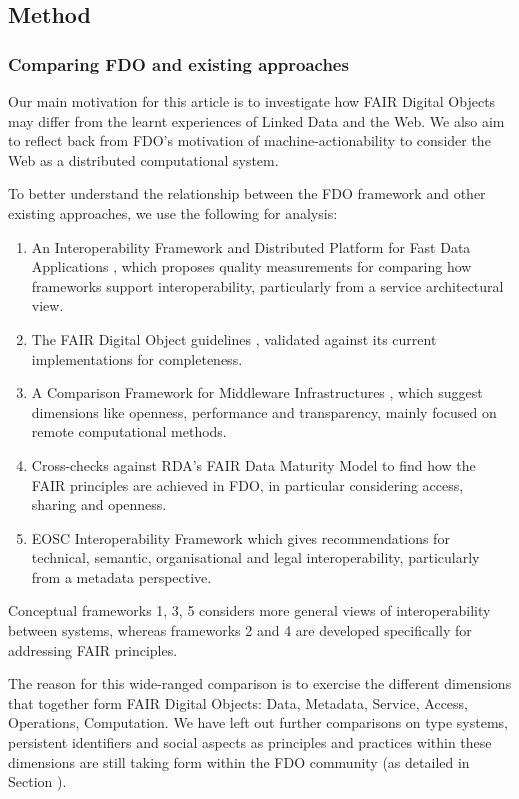 \subsection{Method}\label{ch3:method}

\subsubsection{Comparing FDO and existing approaches}\label{ch3:comparing}

Our main motivation for this article is to investigate how FAIR Digital Objects may differ from the learnt experiences of Linked Data and the Web. We also aim to reflect back from FDO's motivation of machine-actionability to consider the Web as a distributed computational system.

To better understand the relationship between the FDO framework and other existing approaches, we use the following for analysis:

\begin{enumerate}
\tightlist
\item
  An Interoperability Framework and Distributed Platform for Fast Data Applications \cite{Delgado 2016}, which proposes quality measurements for comparing how frameworks support interoperability, particularly from a service architectural view.
\item
  The FAIR Digital Object guidelines \cite{Bonino 2019}, validated against its current implementations for completeness.
\item
  A Comparison Framework for Middleware Infrastructures \cite{Zarras 2004}, which suggest dimensions like openness, performance and transparency, mainly focused on remote computational methods.
\item
  Cross-checks against RDA's FAIR Data Maturity Model \cite{Bahui 2020} to find how the FAIR principles are achieved in FDO, in particular considering access, sharing and openness.
\item
  EOSC Interoperability Framework \cite{Kurowski 2021} which gives recommendations for technical, semantic, organisational and legal interoperability, particularly from a metadata perspective.
\end{enumerate}

Conceptual frameworks 1, 3, 5 considers more general views of interoperability between systems, whereas frameworks 2 and 4 are developed specifically for addressing FAIR principles. 

The reason for this wide-ranged comparison is to exercise the different dimensions that together form FAIR Digital Objects: Data, Metadata, Service, Access, Operations, Computation.
We have left out further comparisons on type systems, persistent identifiers and social aspects as principles and practices within these dimensions are still taking form within the FDO community (as detailed in Section ).

